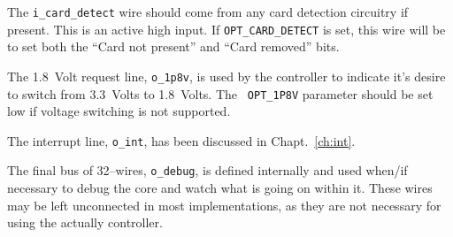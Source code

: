 \documentclass{gqtekspec}
\begin{document}
The {\tt i\_card\_detect} wire should come from any card detection circuitry
if present.  This is an active high input.  If {\tt OPT\_CARD\_DETECT} is
set, this wire will be to set both the ``Card not present'' and ``Card
removed'' bits.

The 1.8~Volt request line, {\tt o\_1p8v}, is used by the controller to
indicate it's desire to switch from 3.3~Volts to 1.8~Volts.  The {\tt
OPT\_1P8V} parameter should be set low if voltage switching is not supported.

The interrupt line, {\tt o\_int}, has been discussed in Chapt.~\ref{ch:int}.

The final bus of 32--wires, {\tt o\_debug}, is defined internally and used
when/if necessary to debug the core and watch what is going on within it.
These wires may be left unconnected in most implementations, as they are not
necessary for using the actually controller.

\end{document}
